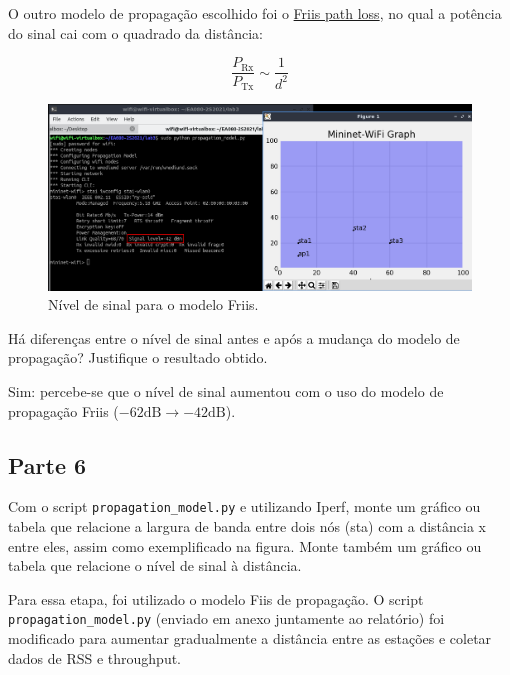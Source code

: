 \documentclass{article}
\begin{document}
O outro modelo de propagação escolhido foi o \href{https://en.wikipedia.org/wiki/Friis_transmission_equation}{Friis path loss},
no qual a potência do sinal cai com o quadrado da distância:

\begin{equation*}
    \frac{P_{\text{Rx}}}{P_{\text{Tx}}} \sim \frac{1}{d^2}
\end{equation*}

\begin{figure}[!htb]
\centering
\includegraphics[width=0.8\columnwidth]{images/p5_signal_level_after.png}
\caption{Nível de sinal para o modelo Friis.}
\label{fig:p5_signal_level_after}
\end{figure}

\begin{tcolorbox}
    Há diferenças entre o nível de sinal antes e após a mudança do modelo de propagação? Justifique o resultado obtido.
\end{tcolorbox}

Sim: percebe-se que o nível de sinal aumentou com o uso do modelo
de propagação Friis ($-62 \text{dB} \rightarrow -42 \text{dB}$).

\subsection{Parte 6}

\begin{tcolorbox}
Com o script \texttt{propagation\_model.py} e utilizando Iperf, monte um gráfico ou tabela que relacione a largura de banda entre dois nós (sta) com a distância x entre eles, assim como exemplificado na figura. Monte também um gráfico ou tabela que relacione o nível de sinal à distância.
\end{tcolorbox}

Para essa etapa, foi utilizado o modelo Fiis de propagação.
O script \texttt{propagation\_model.py} (enviado em anexo
juntamente ao relatório)
foi modificado para
aumentar gradualmente a distância entre as estações e
coletar dados de RSS e throughput.
\end{document}
